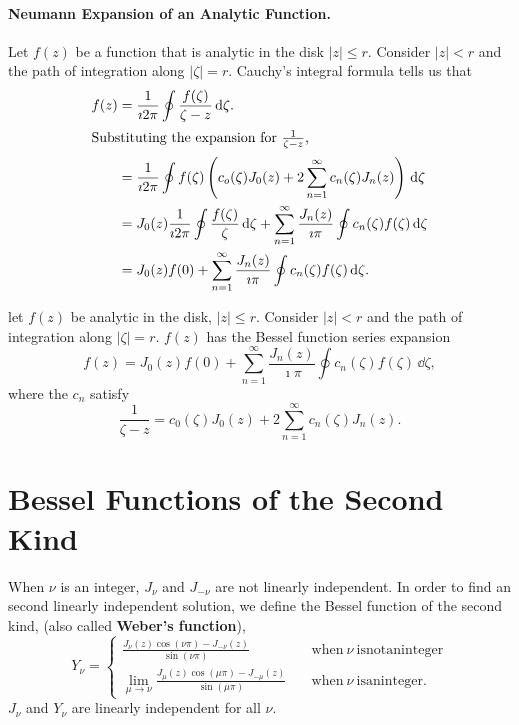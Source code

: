 \paragraph{Neumann Expansion of an Analytic Function.}
Let $f(z)$ be a function that is analytic in the disk $|z| \leq r$.  
Consider $|z| < r$ and the path of integration along $|\zeta| = r$.  
Cauchy's integral formula tells us that
\begin{align*}
  f(z)    
  &= \frac{1}{\imath 2 \pi} \oint \frac{f(\zeta)}{\zeta-z}\,\mathrm{d} \zeta. 
  \\
  \intertext{Substituting the expansion for $\frac{1}{\zeta-z}$,}
  &= \frac{1}{\imath 2 \pi} \oint f(\zeta) \left( c_o(\zeta) J_0(z) + 
    2 \sum_{n = 1}^\infty c_n(\zeta) J_n(z) \right)\,\mathrm{d} \zeta 
  \\
  &= J_0(z) \frac{1}{\imath 2 \pi} \oint \frac{f(\zeta)}{\zeta}\,\mathrm{d} \zeta + 
  \sum_{n = 1}^\infty \frac{J_n(z)}{\imath \pi} \oint c_n(\zeta) f(\zeta)\,\mathrm{d} \zeta 
  \\
  &= J_0(z) f(0) + \sum_{n = 1}^\infty \frac{J_n(z)}{\imath \pi} \oint c_n(\zeta) f(\zeta)\,\mathrm{d} \zeta.
\end{align*}





\begin{Result}
  let $f(z)$ be analytic in the disk, $|z| \leq r$.  Consider $|z| < r$ and the
  path of integration along $|\zeta| = r$.  $f(z)$ has the Bessel function
  series expansion
  \[ 
  f(z) = J_0(z) f(0) + \sum_{n = 1}^\infty \frac{J_n(z)}{\imath \pi} \oint c_n(\zeta) f(\zeta)\,\dd \zeta, 
  \]
  where the $c_n$ satisfy
  \[ 
  \frac{1}{\zeta - z} = c_0(\zeta) J_0(z) + 2 \sum_{n = 1}^\infty c_n(\zeta) J_n(z). 
  \]
\end{Result}











\section{Bessel Functions of the Second Kind}


When $\nu$ is an integer, $J_\nu$ and $J_{-\nu}$ are not linearly 
independent.  In order to find an second linearly independent solution,
we define the Bessel function of the second kind, (also called 
\textbf{Weber's function}),
\[ 
Y_\nu
= \begin{cases}
  \frac{J_\nu(z) \cos(\nu \pi) 
    - J_{-\nu}(z)}{\sin(\nu \pi)} 
  \quad &\mathrm{when}\ \nu\ \mathrm{is not an integer} \\
  \lim_{\mu \to \nu} \frac{J_\mu(z) \cos(\mu \pi) 
    - J_{-\mu}(z)}{\sin(\mu \pi)} 
  \quad &\mathrm{when}\ \nu\ \mathrm{is an integer}.
\end{cases}
\]
$J_\nu$ and $Y_\nu$ are linearly independent for all $\nu$.

